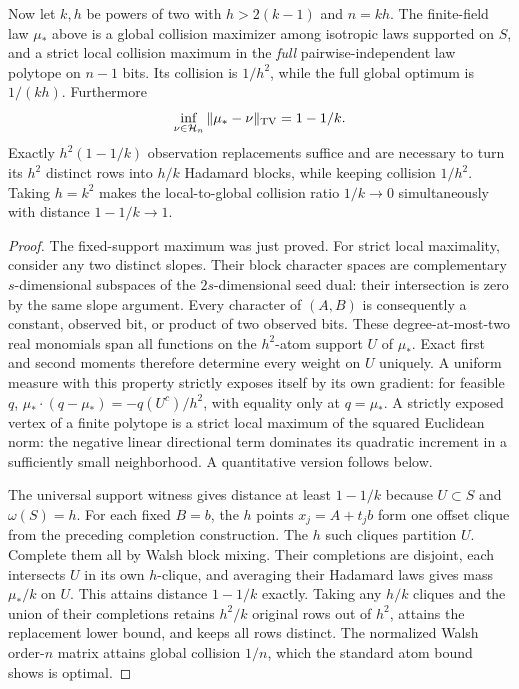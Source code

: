 \begin{theorem}
\label{thm:design-concentrated-trap}
Now let $k,h$ be powers of two with $h>2(k-1)$ and $n=kh$.
The finite-field law $\mu_*$ above is a global collision maximizer among
isotropic laws supported on $S$, and a strict local collision maximum
in the \emph{full} pairwise-independent law polytope on $n-1$ bits.
Its collision is $1/h^2$, while the full global optimum is $1/(kh)$.
Furthermore
\[
 \inf_{\nu\in\mathcal H_n}\|\mu_*-\nu\|_{\rm TV}=1-1/k.
\]
Exactly $h^2(1-1/k)$ observation replacements suffice and are necessary
to turn its $h^2$ distinct rows into $h/k$ Hadamard blocks, while keeping
collision $1/h^2$. Taking $h=k^2$ makes the local-to-global collision
ratio $1/k\to0$ simultaneously with distance $1-1/k\to1$.
\end{theorem}
\begin{proof}
The fixed-support maximum was just proved. For strict local maximality,
consider any two distinct slopes. Their block character spaces are
complementary $s$-dimensional subspaces of the $2s$-dimensional seed
dual: their intersection is zero by the same slope argument. Every
character of $(A,B)$ is consequently a constant, observed bit, or product
of two observed bits. These degree-at-most-two real monomials span all
functions on the $h^2$-atom support $U$ of $\mu_*$. Exact first and second
moments therefore determine every weight on $U$ uniquely.
A uniform measure with this property strictly exposes itself by its
own gradient: for feasible $q$,
$\mu_*\cdot(q-\mu_*)=-q(U^c)/h^2$, with equality only at $q=\mu_*$.
A strictly exposed vertex of a finite polytope is a strict local maximum
of the squared Euclidean norm: the negative linear directional term
dominates its quadratic increment in a sufficiently small neighborhood.
A quantitative version follows below.

The universal support witness gives distance at least $1-1/k$ because
$U\subset S$ and $\omega(S)=h$. For each fixed $B=b$, the $h$ points
$x_j=A+t_jb$ form one offset clique from the preceding completion
construction. The $h$ such cliques partition $U$. Complete them all by
Walsh block mixing. Their completions are disjoint, each intersects $U$
in its own $h$-clique, and averaging their Hadamard laws gives mass
$\mu_*/k$ on $U$. This attains distance $1-1/k$ exactly. Taking any
$h/k$ cliques and the union of their completions retains $h^2/k$ original
rows out of $h^2$, attains the replacement lower bound, and keeps all
rows distinct. The normalized Walsh order-$n$ matrix attains global
collision $1/n$, which the standard atom bound shows is optimal.
\end{proof}

